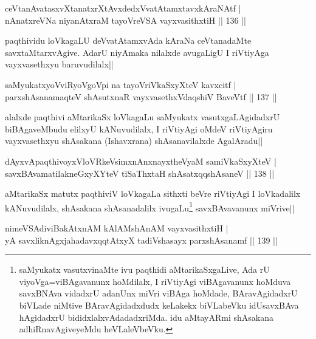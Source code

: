 \begin{shl}
ceVtanAvatasxvXtanatxrXtAvxdedxVvatAtamxtavxkAraNAtf |\\
nAnatxreVNa niyanAtxraM tayoVreVSA vayxvasithxtiH \hfill || 136 ||
\end{shl}

\begin{artha}
paqthividu loVkagaLU deVvatAtamxvAda kAraNa ceVtanadaMte savxtaMtarxvAgive. AdarU niyAmaka nilalxde avugaLigU I riVtiyAga vayxvasethxyu baruvudilalx||
\end{artha}

\begin{shl}
saMyukatxyoVviRyoVgoV\s pi na tayoVriVkaSxyXteV kavxcitf |\\
parxshAsanamaqteV shAsutxnaR vayxvasethxVdaqshiV BaveVtf \hfill || 137 ||
\end{shl}

\begin{artha}
alalxde paqthivi aMtarikaSx loVkagaLu saMyukatx vasutxgaLAgidadxrU biBAgaveMbudu elilxyU kANuvudilalx, I riVtiyAgi oMdeV riVtiyAgiru vayxvasethxyu shAsakana (Ishavxrana) shAsanavilalxde AgalAradu||
\end{artha}

\begin{shl}
dAyxvApaqthivoyxVloVRkeV\s simxnAnxnayxtheVyaM samiVkaSxyXteV |\\
savxBAvamatilakneGxyXYteV tiSaThxtaH shAsatxqqshAsaneV \hfill || 138 ||
\end{shl}

\begin{artha}
aMtarikaSx matutx paqthiviV loVkagaLa sithxti beVre riVtiyAgi I loVkadalilx kANuvudilalx, shAsakana shAsanadalilx ivugaLu\footnote[2]{saMyukatx vasutxvinaMte ivu paqthidi aMtarikaSxgaLive, Ada rU viyoVga=viBAgavanunx hoMdilalx, I riVtiyAgi viBAgavanunx hoMduva savxBNAva vidadxrU adanUnx miVri viBAga hoMdade, BAravAgidadxrU biVLade niMtive BAravAgidadxdudx keLakekx biVLabeVku idUsavxBAva hAgidadxrU bididxlalxvAdadadxriMda. idu aMtayARmi shAsakana adhiRnavAgiveyeMdu heVLaleVbeVku.} savxBAvavanunx miVrive||
\end{artha}


\begin{shl}
nimeVSAdiviBakAtxnAM kAlAMshAnAM vayxvasithxtiH |\\
yA savxliknAgxjahadavxqqtAtxyX tadiVshasayx parxshAsanamf \hfill || 139 ||
\end{shl}

